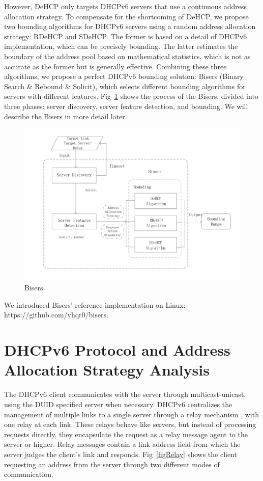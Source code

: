 \documentclass[conference]{IEEEtran}
\begin{document}
However, DeHCP only targets DHCPv6 servers that use a continuous
address allocation strategy. To compensate for the shortcoming of
DeHCP, we propose two bounding algorithms for DHCPv6 servers using a
random address allocation strategy: RDeHCP and SDeHCP. The former is
based on a detail of DHCPv6 implementation, which can be precisely
bounding. The latter estimates the boundary of the address pool based
on mathematical statistics, which is not as accurate as the former but
is generally effective. Combining these three algorithms, we propose a
perfect DHCPv6 bounding solution: Bisers (Binary Search \& Rebound \&
Solicit), which selects different bounding algorithms for servers with
different features. Fig~\ref{figBisers} shows the process of the
Bisers, divided into three phases: server discovery, server feature
detection, and bounding. We will describe the Bisers in more detail
later.

\begin{figure}[tbp]
  \centerline{\includegraphics[scale=0.4]{bisers.pdf}}
  \caption{Bisers}
  \label{figBisers}
\end{figure}

We introduced Bisers' reference implementation on Linux:
https://github.com/vhqr0/bisers.

\section{DHCPv6 Protocol and Address Allocation Strategy Analysis}

The DHCPv6 client communicates with the server through
multicast-unicast, using the DUID specified server when
necessary. DHCPv6 centralizes the management of multiple links to a
single server through a relay mechanism \cite{carney_dynamic_2003}
\cite{mrugalski_dynamic_2018}, with one relay at each link. These
relays behave like servers, but instead of processing requests
directly, they encapsulate the request as a relay message agent to the
server or higher. Relay messages contain a link address field from
which the server judges the client's link and
responds. Fig~\ref{figRelay} shows the client requesting an address
from the server through two different modes of communication.
\end{document}
